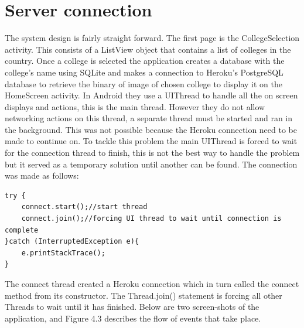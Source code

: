 \section{Server connection}
The system design is fairly straight forward. The first page is the CollegeSelection activity. This consists of a ListView object that contains a list of colleges in the country. Once a college is selected the application creates a database with the college's name using SQLite and makes a connection to Heroku's PostgreSQL database to retrieve the binary of image of chosen college to display it on the HomeScreen activity. In Android they use a UIThread to handle all the on screen displays and actions, this is the main thread. However they do not allow networking actions on this thread, a separate thread must be started and ran in the background. This was not possible because the Heroku connection need to be made to continue on. To tackle this problem the main UIThread is forced to wait for the connection thread to finish, this is not the best way to handle the problem but it served as a temporary solution until another can be found. The connection was made as follows:

\begin{verbatim}
try {
	connect.start();//start thread
	connect.join();//forcing UI thread to wait until connection is complete
}catch (InterruptedException e){
	e.printStackTrace();
}
\end{verbatim}

The connect thread created a Heroku connection which in turn called the connect method from its constructor. The Thread.join() statement is forcing all other Threads to wait until it has finished. Below are two screen-shots of the application, and Figure 4.3 describes the flow of events that take place.

